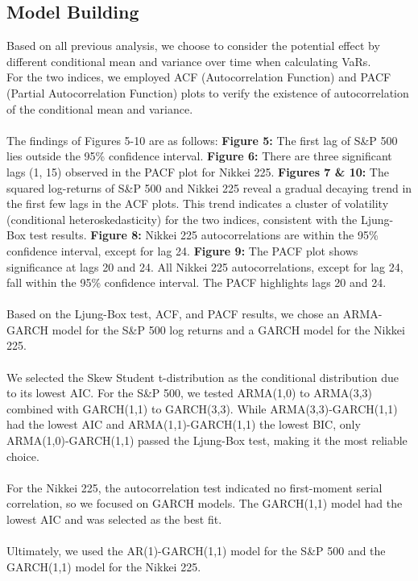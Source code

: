 \documentclass{article}
\begin{document}
\subsection{Model Building}
Based on all previous analysis, we choose to consider the potential effect by different conditional mean and variance over time when calculating VaRs.
\\For the two indices, we employed ACF (Autocorrelation Function) and PACF (Partial Autocorrelation Function) plots to verify the existence of autocorrelation of the conditional mean and variance.\\
\\The findings of Figures 5-10 are as follows: 
\textbf{Figure 5:} The first lag of S&P 500 lies outside the 95\% confidence interval.
\textbf{Figure 6:} There are three significant lags (1, 15) observed in the PACF plot for Nikkei 225.
\textbf{Figures 7 \& 10:} The squared log-returns of S&P 500 and Nikkei 225 reveal a gradual decaying trend in the first few lags in the ACF plots. This trend indicates a cluster of volatility (conditional heteroskedasticity) for the two indices, consistent with the Ljung-Box test results.
\textbf{Figure 8:} Nikkei 225 autocorrelations are within the 95\% confidence interval, except for lag 24.
\textbf{Figure 9:} The PACF plot shows significance at lags 20 and 24. All Nikkei 225 autocorrelations, except for lag 24, fall within the 95\% confidence interval. The PACF highlights lags 20 and 24.\\ 
\\Based on the Ljung-Box test, ACF, and PACF results, we chose an ARMA-GARCH model for the S\&P 500 log returns and a GARCH model for the Nikkei 225.\\
\\We selected the Skew Student t-distribution as the conditional distribution due to its lowest AIC. For the S\&P 500, we tested ARMA(1,0) to ARMA(3,3) combined with GARCH(1,1) to GARCH(3,3). While ARMA(3,3)-GARCH(1,1) had the lowest AIC and ARMA(1,1)-GARCH(1,1) the lowest BIC, only ARMA(1,0)-GARCH(1,1) passed the Ljung-Box test, making it the most reliable choice.\\
\\For the Nikkei 225, the autocorrelation test indicated no first-moment serial correlation, so we focused on GARCH models. The GARCH(1,1) model had the lowest AIC and was selected as the best fit.\\
\\Ultimately, we used the AR(1)-GARCH(1,1) model for the S\&P 500 and the GARCH(1,1) model for the Nikkei 225.\\
\end{document}
